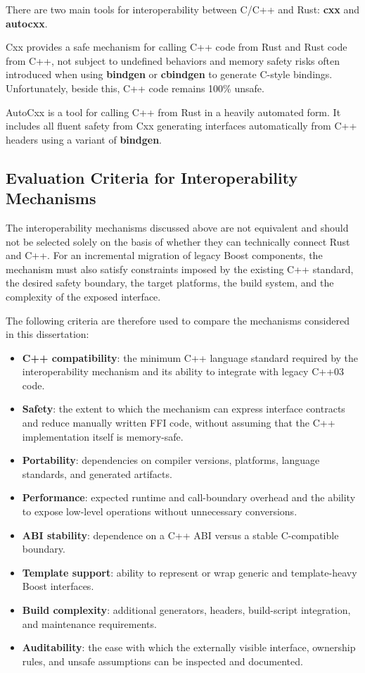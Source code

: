 There are two main tools for interoperability between C/C++ and Rust: \textbf{cxx} and \textbf{autocxx}. 

Cxx provides a safe mechanism for calling C++ code from Rust and Rust code from C++, not subject to undefined behaviors and
memory safety risks often introduced when using \textbf{bindgen} or \textbf{cbindgen} to generate C-style bindings.
Unfortunately, beside this, C++ code remains 100\% unsafe. 

AutoCxx is a tool for calling C++ from Rust in a heavily automated form. It includes all fluent safety from Cxx generating
interfaces automatically from C++ headers using a variant of \textbf{bindgen}.

\subsection{Evaluation Criteria for Interoperability Mechanisms}
\label{sec:ffi_evaluation_criteria}

The interoperability mechanisms discussed above are not equivalent and should not be selected solely on the basis of whether they can technically connect Rust and C++. For an incremental migration of legacy Boost components, the mechanism must also satisfy constraints imposed by the existing C++ standard, the desired safety boundary, the target platforms, the build system, and the complexity of the exposed interface.

The following criteria are therefore used to compare the mechanisms considered in this dissertation:

\begin{itemize}
    \item \textbf{C++ compatibility}: the minimum C++ language standard required by the interoperability mechanism and its ability to integrate with legacy C++03 code.
    \item \textbf{Safety}: the extent to which the mechanism can express interface contracts and reduce manually written FFI code, without assuming that the C++ implementation itself is memory-safe.
    \item \textbf{Portability}: dependencies on compiler versions, platforms, language standards, and generated artifacts.
    \item \textbf{Performance}: expected runtime and call-boundary overhead and the ability to expose low-level operations without unnecessary conversions.
    \item \textbf{ABI stability}: dependence on a C++ ABI versus a stable C-compatible boundary.
    \item \textbf{Template support}: ability to represent or wrap generic and template-heavy Boost interfaces.
    \item \textbf{Build complexity}: additional generators, headers, build-script integration, and maintenance requirements.
    \item \textbf{Auditability}: the ease with which the externally visible interface, ownership rules, and unsafe assumptions can be inspected and documented.
\end{itemize}


